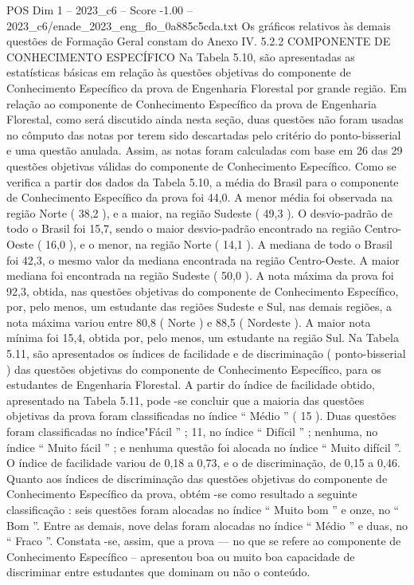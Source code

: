 \begin{textsample}{POS Dim 1 – 2023\_c6 – Score -1.00 – 2023\_c6/enade\_2023\_eng\_flo\_0a885c5cda.txt}
Os gráficos relativos às demais questões de Formação Geral constam do Anexo IV. 5.2.2 COMPONENTE DE CONHECIMENTO ESPECÍFICO Na Tabela 5.10, são apresentadas as estatísticas básicas em relação às questões objetivas do componente de Conhecimento Específico da prova de Engenharia Florestal por grande região.
Em relação ao componente de Conhecimento Específico da prova de Engenharia Florestal, como será discutido ainda nesta seção, duas questões não foram usadas no cômputo das notas por terem sido descartadas pelo critério do ponto-bisserial e uma questão anulada.
Assim, as notas foram calculadas com base em 26 das 29 questões objetivas válidas do componente de Conhecimento Específico.
Como se verifica a partir dos dados da Tabela 5.10, a média do Brasil para o componente de Conhecimento Específico da prova foi 44,0.
A menor média foi observada na região Norte ( 38,2 ), e a maior, na região Sudeste ( 49,3 ).
O desvio-padrão de todo o Brasil foi 15,7, sendo o maior desvio-padrão encontrado na região Centro-Oeste ( 16,0 ), e o menor, na região Norte ( 14,1 ).
A mediana de todo o Brasil foi 42,3, o mesmo valor da mediana encontrada na região Centro-Oeste.
A maior mediana foi encontrada na região Sudeste ( 50,0 ).
A nota máxima da prova foi 92,3, obtida, nas questões objetivas do componente de Conhecimento Específico, por, pelo menos, um estudante das regiões Sudeste e Sul, nas demais regiões, a nota máxima variou entre 80,8 ( Norte ) e 88,5 ( Nordeste ).
A maior nota mínima foi 15,4, obtida por, pelo menos, um estudante na região Sul.
Na Tabela 5.11, são apresentados os índices de facilidade e de discriminação ( ponto-bisserial ) das questões objetivas do componente de Conhecimento Específico, para os estudantes de Engenharia Florestal.
A partir do índice de facilidade obtido, apresentado na Tabela 5.11, pode -se concluir que a maioria das questões objetivas da prova foram classificadas no índice “ Médio ” ( 15 ).
Duas questões foram classificadas no índice"Fácil ” ; 11, no índice “ Difícil ” ; nenhuma, no índice “ Muito fácil ” ; e nenhuma questão foi alocada no índice “ Muito difícil ”.
O índice de facilidade variou de 0,18 a 0,73, e o de discriminação, de 0,15 a 0,46.
Quanto aos índices de discriminação das questões objetivas do componente de Conhecimento Específico da prova, obtém -se como resultado a seguinte classificação : seis questões foram alocadas no índice “ Muito bom ” e onze, no “ Bom ”.
Entre as demais, nove delas foram alocadas no índice “ Médio ” e duas, no “ Fraco ”.
Constata -se, assim, que a prova — no que se refere ao componente de Conhecimento Específico – apresentou boa ou muito boa capacidade de discriminar entre estudantes que dominam ou não o conteúdo.

\end{textsample}
